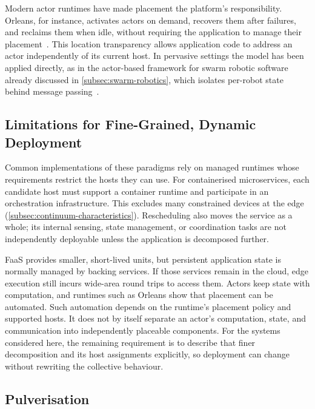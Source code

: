 Modern actor runtimes have made placement the platform's responsibility.
%
Orleans, for instance, activates actors on demand,
recovers them after failures,
and reclaims them when idle,
without requiring the application to manage their placement~\cite{DBLP:conf/cloud/BykovGKLPT11}.
%
This location transparency allows application code to address an actor independently of its current host.
%
In pervasive settings the model has been applied directly,
as in the actor-based framework for swarm robotic software already discussed in \cref{subsec:swarm-robotics},
which isolates per-robot state behind message passing~\cite{DBLP:conf/iros/YiDLD0WY20}.

\subsection{Limitations for Fine-Grained, Dynamic Deployment}
\label{subsec:paradigm-limitations}

Common implementations of these paradigms rely on managed runtimes whose requirements restrict the hosts they can use.
For containerised microservices,
each candidate host must support a container runtime and participate in an orchestration infrastructure.
This excludes many constrained devices at the edge (\cref{subsec:continuum-characteristics}).
Rescheduling also moves the service as a whole;
its internal sensing, state management, or coordination tasks are not independently deployable unless the application is decomposed further.

\ac{FaaS} provides smaller, short-lived units,
but persistent application state is normally managed by backing services.
If those services remain in the cloud,
edge execution still incurs wide-area round trips to access them.
%
Actors keep state with computation,
and runtimes such as Orleans show that placement can be automated.
Such automation depends on the runtime's placement policy and supported hosts.
It does not by itself separate an actor's computation,
state,
and communication into independently placeable components.
%
For the systems considered here,
the remaining requirement is to describe that finer decomposition and its host assignments explicitly,
so deployment can change without rewriting the collective behaviour.

\subsection{Pulverisation}
\label{subsec:pulverisation-background}

